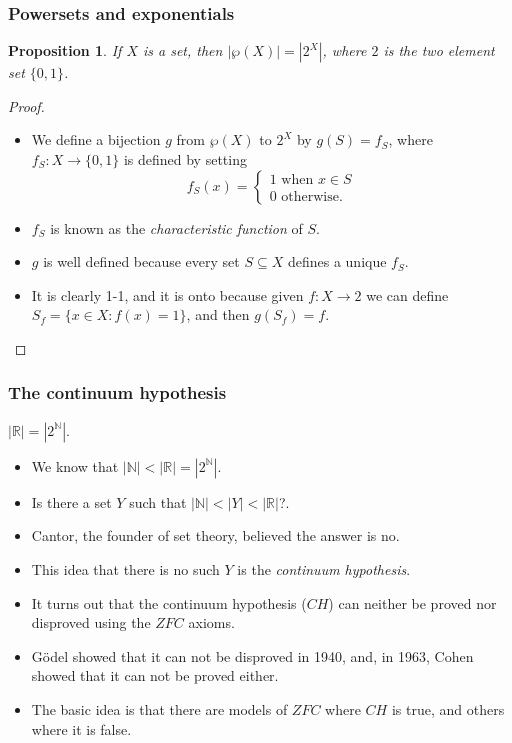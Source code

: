 \documentclass[handout]{beamer}
\newtheorem{proposition}[theorem]{Proposition}
\newcommand{\bN}{\mathbb{N}}
\newcommand{\bR}{\mathbb{R}}
\begin{document}
\begin{frame}
\frametitle{Powersets and exponentials}

\begin{proposition}
If $X$ is a set, then $|\wp(X)|=|2^X|$, where $2$ is the two element set $\{0,1\}$.
\end{proposition}
\begin{proof}
\begin{itemize}
\item We define a bijection $g$ from $\wp(X)$ to $2^X$ by $g(S) = f_S$, where $f_S:X\to\{0,1\}$ is defined by setting 
\[f_S(x)=\begin{cases} 1 \text{ when $x\in S$} \\
0 \text{ otherwise.}\end{cases}\]
\item $f_S$ is known as the \emph{characteristic function} of $S$.
\item $g$ is well defined because every set $S\subseteq X$ defines a unique $f_S$. 
\item It is clearly 1-1, and it is onto because given $f:X\to 2$ we can define $S_f=\{x\in X: f(x)=1\}$, and then $g(S_f)=f$.
\end{itemize}
\end{proof}
\end{frame}

\begin{frame}
\frametitle{The continuum hypothesis}

\begin{fact}\label{Fa:R}
$|\bR|=|2^\bN|$.
\end{fact}

\begin{itemize} 
\item We know that $|\bN|<|\bR| = |2^\bN|$. 
\item Is there a set $Y$ such that $|\bN|<|Y|<|\bR|$?. 
\item Cantor, the founder of set theory, believed the answer is no. 
\item This idea that there is no such $Y$ is the \emph{continuum hypothesis}.
\item It turns out that the continuum hypothesis ($CH$) can neither be proved nor disproved using the $ZFC$ axioms. 
\item G\"odel showed that it can not be disproved in 1940, and, in 1963, Cohen showed that it can not be proved either. 
\item The basic idea is that there are models of $ZFC$ where $CH$ is true, and others where it is false. 
\end{itemize}
\end{frame}
\end{document}
